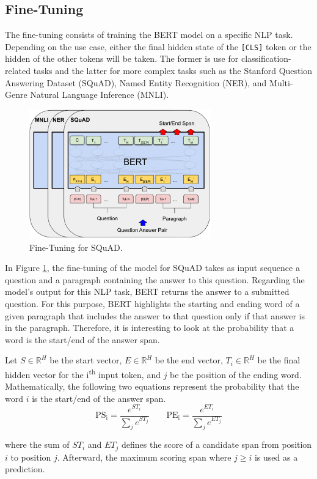 \subsection{Fine-Tuning}
\label{subsec:bert:fine-tuning}

The fine-tuning consists of training the BERT model on a specific NLP
task. Depending on the use case, either the final hidden state of the
\texttt{[CLS]} token or the hidden of the other tokens will be taken. The former
is use for classification-related tasks and the latter for more complex tasks
such as the Stanford Question Answering Dataset (SQuAD), Named Entity
Recognition (NER), and Multi-Genre Natural Language Inference (MNLI).
\begin{figure}[!ht]
  \centering
  \includegraphics[width=0.7\textwidth]{img/embedders/bert/fine-tuning}
  \caption{Fine-Tuning for SQuAD.}
  \label{fig:bert:fine-tuning}
\end{figure}

In Figure \ref{fig:bert:fine-tuning}, the fine-tuning of the model for SQuAD
takes as input sequence a question and a paragraph containing the answer to this
question. Regarding the model's output for this NLP task, BERT returns the
answer to a submitted question. For this purpose, BERT highlights the starting
and ending word of a given paragraph that includes the answer to that question
only if that answer is in the paragraph. Therefore, it is interesting to look at
the probability that a word is the start/end of the answer span.

\begin{definition}
  Let $S \in \mathbb{R}^H$ be the start vector, $E \in \mathbb{R}^H$ be the end
  vector, $T_i \in \mathbb{R}^H$ be the final hidden vector for the
  i\textsuperscript{th} input token, and $j$ be the position of the ending
  word. Mathematically, the following two equations represent the probability that
  the word $i$ is the start/end of the answer span.
  \begin{equation}
    \mathrm{PS_i} = \frac{e^{ST_i}}{\sum_je^{ST_j}} \qquad \mathrm{PE_i} = \frac{e^{ET_i}}{\sum_je^{ET_j}}
    \label{eq:def:bert:word:probabilities}
  \end{equation}

  where the sum of $ST_i$ and $ET_j$ defines the score of a candidate span from
  position $i$ to position $j$. Afterward, the maximum scoring span where $j \geq
  i$ is used as a prediction.
  \label{def:squad:word:probability}
\end{definition}

